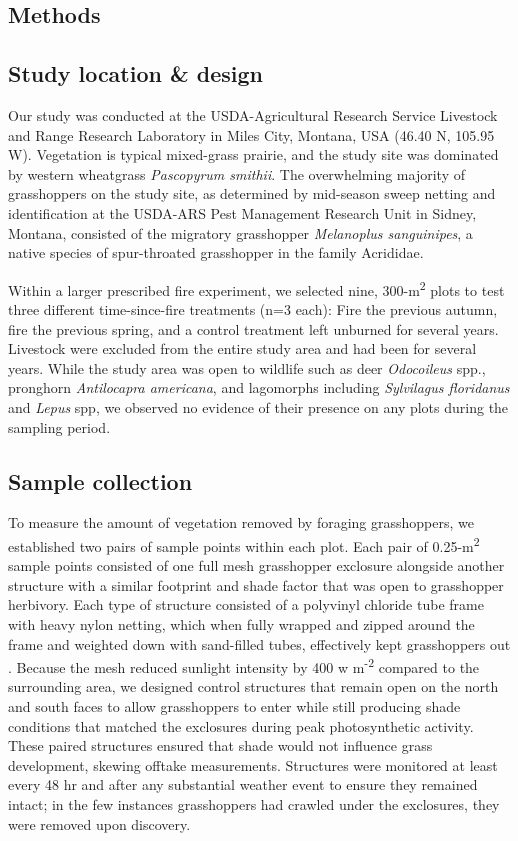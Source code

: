 \documentclass[referee, 
	            sn-basic]
           {sn-jnl}
\begin{document}
\begin{linenumbers}
\section{Methods}

\subsection{Study location \& design} 

Our study was conducted at the USDA-Agricultural Research Service Livestock and Range Research Laboratory in Miles City, Montana, USA (46.40 N, 105.95 W).  
Vegetation is typical mixed-grass prairie, and the study site was dominated by western wheatgrass \emph{Pascopyrum smithii}.  
The overwhelming majority of grasshoppers on the study site, as determined by mid-season sweep netting and identification at the USDA-ARS Pest Management Research Unit in Sidney, Montana, consisted of the migratory grasshopper \emph{Melanoplus sanguinipes}, a native species of spur-throated grasshopper in the family Acrididae. 

Within a larger prescribed fire experiment, we selected nine, 300-m\textsuperscript{2} plots to test three different time-since-fire treatments (n=3 each): Fire the previous autumn, fire the previous spring, and a control treatment left unburned for several years. 
Livestock were excluded from the entire study area and had been for several years.
While the study area was open to wildlife such as deer \emph{Odocoileus} spp., pronghorn \emph{Antilocapra americana}, and lagomorphs including \emph{Sylvilagus floridanus} and \emph{Lepus} spp, we observed no evidence of their presence on any plots during the sampling period. 

\subsection{Sample collection}

To measure the amount of vegetation removed by foraging grasshoppers, we established two pairs of sample points within each plot. 
Each pair of 0.25-m\textsuperscript{2} sample points consisted of one full mesh grasshopper exclosure alongside another structure with a similar footprint and shade factor that was open to grasshopper herbivory.
Each type of structure consisted of a polyvinyl chloride tube frame with heavy nylon netting, which when fully wrapped and zipped around the frame and weighted down with sand-filled tubes, effectively kept grasshoppers out \citep{parker1985}. 
Because the mesh reduced sunlight intensity by 400 w m\textsuperscript{-2} compared to the
surrounding area, we designed control structures that remain open on the north and south faces to allow grasshoppers to enter while still producing shade conditions that matched the exclosures during peak photosynthetic activity. 
These paired structures ensured that shade would not influence grass development, skewing offtake measurements. 
Structures were monitored at least every 48 hr and after any substantial weather event to ensure they remained intact; in the few instances grasshoppers had crawled under the exclosures, they were removed upon discovery. 


\end{linenumbers}
\end{document}
